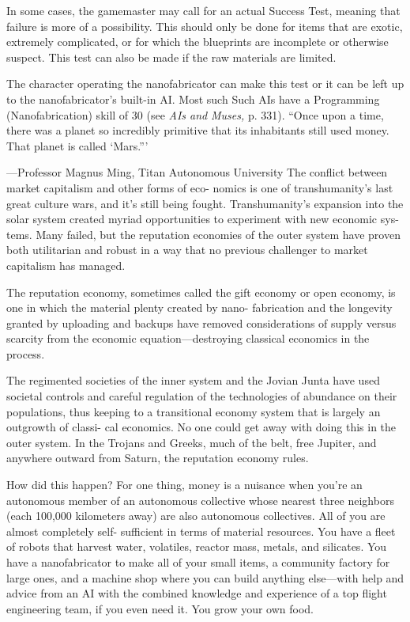 In some cases, the gamemaster may call for an actual Success Test, 
meaning that failure is more of a possibility. This should only be 
done for items that are exotic, extremely complicated, or for which 
the blueprints are incomplete or otherwise suspect. This test can also 
be made if the raw materials are limited.

The character operating the nanofabricator can make this test or 
it can be left up to the nanofabricator's built-in AI. Most such Such 
AIs have a Programming (Nanofabrication) skill of 30 (see \textit{AIs and }
\textit{Muses,} p. 331).
``Once upon a time, there was a planet so incredibly primitive that its 
inhabitants still used money. That planet is called ‘Mars.'''

—Professor Magnus Ming, Titan Autonomous University
The conflict between market capitalism and other forms of eco-
nomics is one of transhumanity's last great culture wars, and it's 
still being fought. Transhumanity's expansion into the solar system 
created myriad opportunities to experiment with new economic sys-
tems. Many failed, but the reputation economies of the outer system 
have proven both utilitarian and robust in a way that no previous 
challenger to market capitalism has managed.

The reputation economy, sometimes called the gift economy or 
open economy, is one in which the material plenty created by nano-
fabrication and the longevity granted by uploading and backups 
have removed considerations of supply versus scarcity from the 
economic equation—destroying classical economics in the process.

The regimented societies of the inner system and the Jovian 
Junta have used societal controls and careful regulation of the 
technologies of abundance on their populations, thus keeping to a 
transitional economy system that is largely an outgrowth of classi-
cal economics. No one could get away with doing this in the outer 
system. In the Trojans and Greeks, much of the belt, free Jupiter, and 
anywhere outward from Saturn, the reputation economy rules.

How did this happen? For one thing, money is a nuisance when 
you're an autonomous member of an autonomous collective whose 
nearest three neighbors (each 100,000 kilometers away) are also 
autonomous collectives. All of you are almost completely self-
sufficient in terms of material resources. You have a fleet of robots 
that harvest water, volatiles, reactor mass, metals, and silicates. You 
have a nanofabricator to make all of your small items, a community 
factory for large ones, and a machine shop where you can build 
anything else—with help and advice from an AI with the combined 
knowledge and experience of a top flight engineering team, if you 
even need it. You grow your own food.

